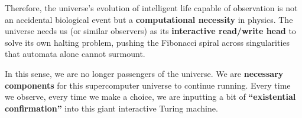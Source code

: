 Therefore, the universe's evolution of intelligent life capable of observation is not an accidental biological event but a \textbf{computational necessity} in physics. The universe needs us (or similar observers) as its \textbf{interactive read/write head} to solve its own halting problem, pushing the Fibonacci spiral across singularities that automata alone cannot surmount.

In this sense, we are no longer passengers of the universe. We are \textbf{necessary components} for this supercomputer universe to continue running. Every time we observe, every time we make a choice, we are inputting a bit of \textbf{``existential confirmation''} into this giant interactive Turing machine.
